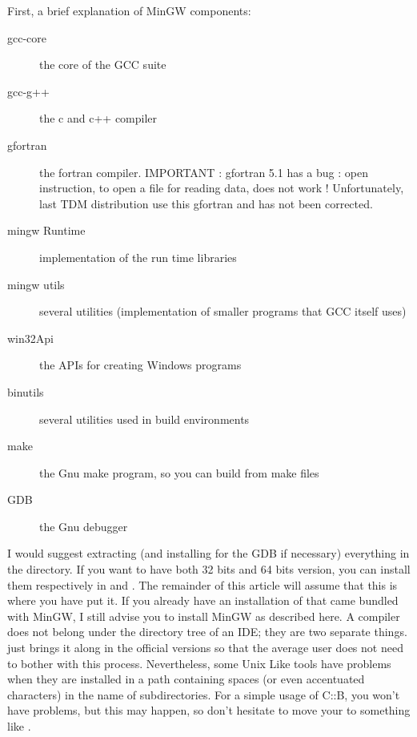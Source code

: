 
First, a brief explanation of MinGW components:

\begin{description}
\item[gcc-core] the core of the GCC suite
\item[gcc-g++] the c and c++ compiler
\item[gfortran] the fortran compiler. IMPORTANT : gfortran 5.1 has a bug : open instruction, to open a file for reading data, does not work ! Unfortunately, last TDM distribution use this gfortran and has not been corrected.
\item[mingw Runtime] implementation of the run time libraries
\item[mingw utils] several utilities (implementation of smaller programs that GCC itself uses)
\item[win32Api] the APIs for creating Windows programs
\item[binutils] several utilities used in build environments
\item[make] the Gnu make program, so you can build from make files
\item[GDB] the Gnu debugger
\end{description}

I would suggest extracting (and installing for the GDB if necessary) everything in the  directory. If you want to have both 32 bits and 64 bits version, you can install them respectively in  and . The remainder of this article will assume that this is where you have put it. If you already have an installation of \codeblocks that came bundled with MinGW, I still advise you to install MinGW as described here. A compiler does not belong under the directory tree of an IDE; they are two separate things. \codeblocks just brings it along in the official versions so that the average user does not need to bother with this process. Nevertheless, some Unix Like tools have problems when they are installed in a path containing spaces (or even accentuated characters) in the name of subdirectories. For a simple usage of C::B, you won't have problems, but this may happen, so don't hesitate to move your  to something like .

